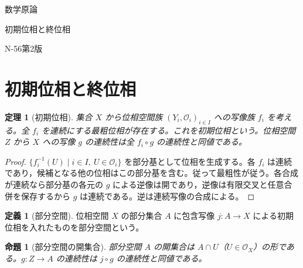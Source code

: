 \documentclass[a5paper,10pt,dvipdfmx]{jsarticle}
\theoremstyle{definition}
\newtheorem{defn}[ruledef]{定義}
\theoremstyle{plain}
\newtheorem{prop}[ruledef]{命題}
\newtheorem{thm}[ruledef]{定理}
\begin{document}
\begin{center}
{\small 数学原論}\par\vspace{4mm}
{\LARGE 初期位相と終位相}\par\vspace{2mm}
{\small N-56\quad 第2版}
\end{center}
\section{初期位相と終位相}
\begin{thm}[初期位相]\label{k253}
集合 $X$ から位相空間族 $(Y_i,\mathcal O_i)_{i\in I}$ への写像族 $f_i$ を考える。全 $f_i$ を連続にする最粗位相が存在する。これを初期位相という。位相空間 $Z$ から $X$ への写像 $g$ の連続性は全 $f_i\circ g$ の連続性と同値である。
\end{thm}
\begin{proof}
$\{f_i^{-1}(U)\mid i\in I,\ U\in\mathcal O_i\}$ を部分基として位相を生成する。各 $f_i$ は連続であり，候補となる他の位相はこの部分基を含む。従って最粗性が従う。各合成が連続なら部分基の各元の $g$ による逆像は開であり，逆像は有限交叉と任意合併を保存するから $g$ は連続である。逆は連続写像の合成による。
\end{proof}
\begin{defn}[部分空間]\label{k254}
位相空間 $X$ の部分集合 $A$ に包含写像 $j\colon A\to X$ による初期位相を入れたものを部分空間という。
\end{defn}
\begin{prop}[部分空間の開集合]\label{k255}
部分空間 $A$ の開集合は $A\cap U$（$U\in\mathcal O_X$）の形である。$g\colon Z\to A$ の連続性は $j\circ g$ の連続性と同値である。
\end{prop}
\end{document}
